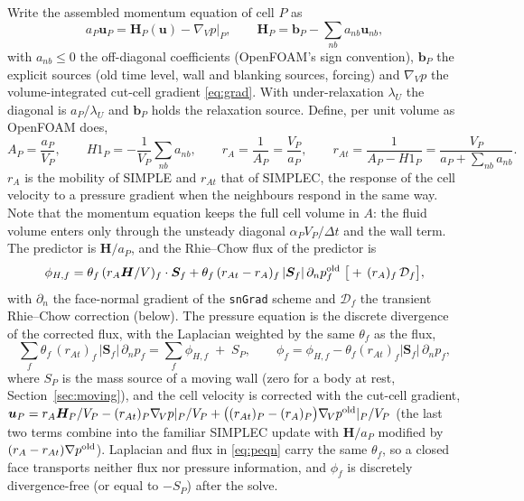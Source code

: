 \documentclass[11pt,a4paper]{article}
\theoremstyle{remark}
\newcommand{\uu}{\bm{u}}
\newcommand{\Sf}{\bm{S}_f}
\newcommand{\dt}{\Delta t}
\newcommand{\code}[1]{\texttt{#1}}
\newcommand{\gradV}{\nabla_{\!V}}
\begin{document}
Write the assembled momentum equation of cell $P$ as
\begin{equation}
a_P\uu_P=\bm H_P(\uu)-\gradV p|_P,\qquad
\bm H_P=\bm b_P-\sum_{nb}a_{nb}\uu_{nb},
\label{eq:mom}
\end{equation}
with $a_{nb}\le0$ the off-diagonal coefficients (OpenFOAM's sign convention), $\bm b_P$ the
explicit sources (old time level, wall and blanking sources, forcing) and $\gradV p$ the
volume-integrated cut-cell gradient \eqref{eq:grad}. With under-relaxation $\lambda_U$ the
diagonal is $a_P/\lambda_U$ and $\bm b_P$ holds the relaxation source. Define, per unit volume
as OpenFOAM does,
\begin{equation}
A_P=\frac{a_P}{V_P},\qquad H1_P=-\frac{1}{V_P}\sum_{nb}a_{nb},\qquad
r_{A}=\frac{1}{A_P}=\frac{V_P}{a_P},\qquad
r_{At}=\frac{1}{A_P-H1_P}=\frac{V_P}{a_P+\sum_{nb}a_{nb}} .
\label{eq:rA}
\end{equation}
$r_A$ is the mobility of SIMPLE and $r_{At}$ that of SIMPLEC, the response of the cell velocity
to a pressure gradient when the neighbours respond in the same way. Note that the momentum
equation keeps the full cell volume in $A$: the fluid volume enters only through the unsteady
diagonal $\alpha_PV_P/\dt$ and the wall term. The predictor is
$\bm H/a_P$, and the Rhie--Chow flux of the predictor is
\begin{equation}
\phi_{H,f}=\theta_f\,(r_A\bm H/V)_f\cdot\Sf
+\theta_f\,(r_{At}-r_A)_f\,|\Sf|\,\partial_np^{\rm old}_f
\;\big[+\,(r_A)_f\,\mathcal{D}_f\big],
\label{eq:phiH}
\end{equation}
with $\partial_n$ the face-normal gradient of the \code{snGrad} scheme and $\mathcal{D}_f$ the
transient Rhie--Chow correction (below). The pressure equation is the discrete divergence of
the corrected flux, with the Laplacian weighted by the same $\theta_f$ as the flux,
\begin{equation}
\sum_f\theta_f\,(r_{At})_f\,|\Sf|\,\partial_np_f=\sum_f\phi_{H,f}
\;+\;S_P
,
\qquad
\phi_f=\phi_{H,f}-\theta_f(r_{At})_f|\Sf|\,\partial_np_f ,
\label{eq:peqn}
\end{equation}
where $S_P$ is the mass source of a moving wall (zero for a body at rest,
Section~\ref{sec:moving}),
and the cell velocity is corrected with the cut-cell gradient,
$\uu_P=r_A\bm H_P/V_P-(r_{At})_P\gradV p|_P/V_P+\big((r_{At})_P-(r_A)_P\big)\gradV p^{\rm old}|_P/V_P$
(the last two terms combine into the familiar SIMPLEC update with
$\bm H/a_P$ modified by $(r_A-r_{At})\nabla p^{\rm old}$). Laplacian and flux in
\eqref{eq:peqn} carry the same $\theta_f$, so a closed face transports neither flux nor
pressure information, and $\phi_f$ is discretely divergence-free
(or equal to $-S_P$)
after the solve.
\end{document}
